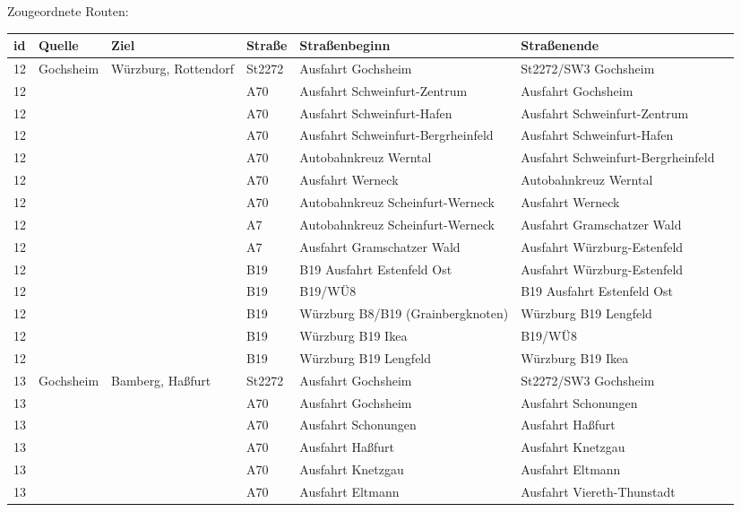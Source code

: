 Zougeordnete Routen:
\newline
\newline
\begin{tabular}{|l|l|l|l|l|l|l|}
    \hline
    id & Quelle & Ziel & Straße & Straßenbeginn & Straßenende\\ 
    \hline
    12 & Gochsheim & Würzburg, Rottendorf & St2272 & Ausfahrt Gochsheim & St2272/SW3 Gochsheim\\ 
    12 &  &  & A70 & Ausfahrt Schweinfurt-Zentrum & Ausfahrt Gochsheim\\ 
    12 &  &  & A70 & Ausfahrt Schweinfurt-Hafen & Ausfahrt Schweinfurt-Zentrum\\ 
    12 &  &  & A70 & Ausfahrt Schweinfurt-Bergrheinfeld & Ausfahrt Schweinfurt-Hafen\\ 
    12 &  &  & A70 & Autobahnkreuz Werntal & Ausfahrt Schweinfurt-Bergrheinfeld\\ 
    12 &  &  & A70 & Ausfahrt Werneck & Autobahnkreuz Werntal\\ 
    12 &  &  & A70 & Autobahnkreuz Scheinfurt-Werneck & Ausfahrt Werneck\\ 
    12 &  &  & A7 & Autobahnkreuz Scheinfurt-Werneck & Ausfahrt Gramschatzer Wald\\ 
    12 &  &  & A7 & Ausfahrt Gramschatzer Wald & Ausfahrt Würzburg-Estenfeld\\ 
    12 &  &  & B19 & B19 Ausfahrt Estenfeld Ost & Ausfahrt Würzburg-Estenfeld\\ 
    12 &  &  & B19 & B19/WÜ8 & B19 Ausfahrt Estenfeld Ost\\ 
    12 &  &  & B19 & Würzburg B8/B19 (Grainbergknoten) & Würzburg B19 Lengfeld\\ 
    12 &  &  & B19 & Würzburg B19 Ikea & B19/WÜ8\\ 
    12 &  &  & B19 & Würzburg B19 Lengfeld & Würzburg B19 Ikea\\ 
    \hline
    13 & Gochsheim & Bamberg, Haßfurt & St2272 & Ausfahrt Gochsheim & St2272/SW3 Gochsheim\\ 
    13 &  &  & A70 & Ausfahrt Gochsheim & Ausfahrt Schonungen\\ 
    13 &  &  & A70 & Ausfahrt Schonungen & Ausfahrt Haßfurt\\ 
    13 &  &  & A70 & Ausfahrt Haßfurt & Ausfahrt Knetzgau\\ 
    13 &  &  & A70 & Ausfahrt Knetzgau & Ausfahrt Eltmann\\ 
    13 &  &  & A70 & Ausfahrt Eltmann & Ausfahrt Viereth-Thunstadt\\ 

\end{tabular}
